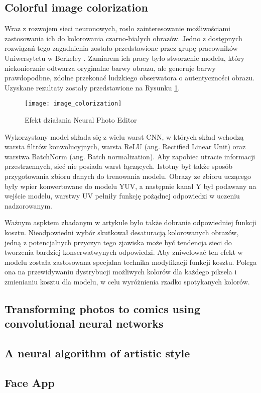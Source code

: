  \subsection{Colorful image colorization}

    Wraz z rozwojem sieci neuronowych, rosło zainteresowanie możliwościami zastosowania
    ich do kolorowania czarno-białych obrazów. Jedno z dostępnych rozwiązań tego
    zagadnienia zostało przedstawione przez grupę pracowników Uniwersytetu w
    Berkeley \cite{colorful_image_colorization}. Zamiarem ich pracy było stworzenie
    modelu, który niekoniecznie odtwarza oryginalne barwy obrazu, ale generuje
    barwy prawdopodbne, zdolne przekonać ludzkiego obserwatora o autentyczności
    obrazu. Uzyskane rezultaty zostały przedstawione na
    Rysunku \ref{fig:colorful_image_colorization}.

    \begin{figure}[h]
      \centering
      \texttt{[image: image\_colorization]}
      \caption{Efekt działania Neural Photo Editor}
      \label{fig:colorful_image_colorization}
    \end{figure}

    Wykorzystany model składa się z wielu warst CNN, w których skład wchodzą
    warsta filtrów konwolucyjnych, warsta ReLU (ang. Rectified
    Linear Unit) oraz warstwa BatchNorm (ang. Batch normalization).
    Aby zapobiec utracie informacji przestrzennych, sieć nie posiada warst łączących.
    Istotny był także sposób
    przygotowania zbioru danych do trenowania modelu. Obrazy ze zbioru uczącego
    były wpier konwertowane do modelu YUV, a następnie kanał Y był podawany na
    wejście modelu, warstwy UV pełniły funkcję pożądnej odpowiedzi w uczeniu
    nadzorowanym.

    Ważnym aspktem zbadanym w artykule było także dobranie odpowiedniej
    funkcji kosztu. Nieodpowiedni wybór skutkował desaturacją kolorowanych
    obrazów, jedną z potencjalnych przyczyn tego zjawiska może być tendencja
    sieci do tworzenia bardziej konserwatwynych odpowiedzi. Aby zniwelować ten
    efekt w modelu została zastosowana specjalna technika modyfikacji
    funkcji kosztu. Polega ona na przewidywaniu dystrybucji możliwych kolorów
    dla każdego piksela i zmienianiu kosztu dla modelu, w celu wyróżnienia rzadko
    spotykanych kolorów.

  \subsection{Transforming photos to comics using convolutional neural networks}

  \subsection{A neural algorithm of artistic style}

  \subsection{Face App}
